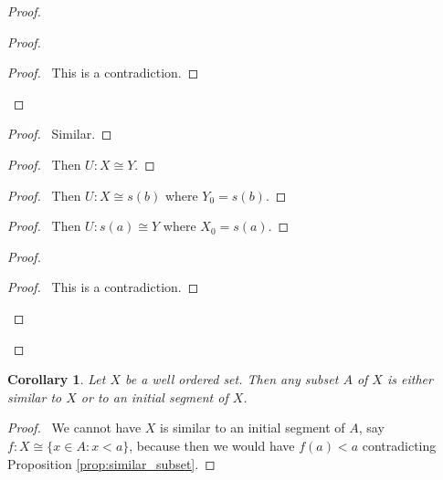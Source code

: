 \documentclass{report}
\let\qed\relax
\newtheorem{cor}{Corollary}[ax]
\theoremstyle{definition}
\newcommand{\ran}{\ensuremath{\operatorname{ran}}}
\begin{document}
\begin{proof}
\pf
{}
\step{3}{\pflet{$Y_0 = \ran U$}}
\begin{proof}
	\qedstep
	\begin{proof}
		\pf\ This is a contradiction.
	\end{proof}
\end{proof}
\begin{proof}
	\pf\ Similar.
\end{proof}
\begin{proof}
	\pf\ Then $U : X \cong Y$.
\end{proof}
\begin{proof}
	\pf\ Then $U : X \cong s(b)$ where $Y_0 = s(b)$.
\end{proof}
\begin{proof}
	\pf\ Then $U : s(a) \cong Y$ where $X_0 = s(a)$.
\end{proof}
\begin{proof}
	\qedstep
	\begin{proof}
		\pf\ This is a contradiction.
	\end{proof}
\end{proof}
\qed
\end{proof}

\begin{cor}
Let $X$ be a well ordered set. Then any subset $A$ of $X$ is either similar to $X$ or to an initial segment of $X$.
\end{cor}

\begin{proof}
\pf\ We cannot have $X$ is similar to an initial segment of $A$, say $f : X \cong \{ x \in A : x < a \}$, because then we would have $f(a) < a$ contradicting Proposition \ref{prop:similar_subset}. \qed
\end{proof}
\end{document}
